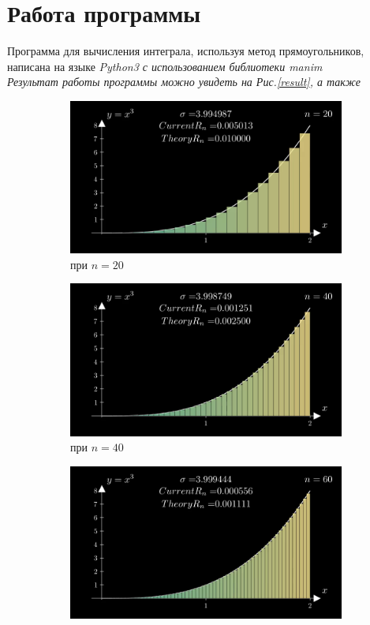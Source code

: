 \documentclass[a4paper, 11pt]{article}
\begin{document}
	\section{Работа программы}
	Программа для вычисления интеграла, используя метод прямоугольников, написана на языке \itshape{Python3} с использованием библиотеки \itshape{manim}\\
	Результат работы программы можно увидеть на Рис.\ref{result}, а также 
	\begin{figure}
		\begin{center}
			\begin{subfigure}{0.45\linewidth}
				\includegraphics[width=\linewidth]{"./20.png"}
				\caption{при $n=20$}
			\end{subfigure}
			\begin{subfigure}{0.45\linewidth}
				\includegraphics[width=\linewidth]{"./40.png"}
				\caption{при $n=40$}
			\end{subfigure}
			\begin{subfigure}{0.45\linewidth}
				\includegraphics[width=\linewidth]{"./60.png"}

\end{subfigure}
\end{center}
\end{figure}
\end{document}
